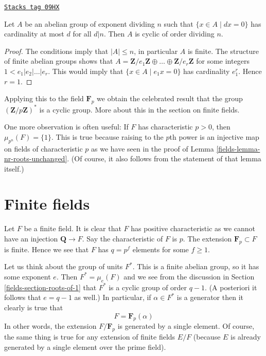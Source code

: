 \begin{lemma}[Cyclic]
\label{fields-lemma-cyclic}
\href{https://stacks.math.columbia.edu/tag/09HX}{\texttt{Stacks tag 09HX}}

Let $A$ be an abelian group of exponent dividing $n$ such that
$\{x \in A \mid dx = 0\}$ has cardinality at most $d$ for all $d | n$.
Then $A$ is cyclic of order dividing $n$.
\end{lemma}

\begin{proof}
The conditions imply that $|A| \leq n$, in particular $A$ is finite.
The structure of finite abelian groups shows that
$A = \mathbf{Z}/e_1\mathbf{Z} \oplus \ldots \oplus \mathbf{Z}/e_r\mathbf{Z}$
for some integers $1 < e_1 | e_2 | \ldots | e_r$. This would imply
that $\{x \in A \mid e_1 x = 0\}$ has cardinality $e_1^r$. Hence
$r = 1$.
\end{proof}

Applying this to the field $\mathbf{F}_p$ we obtain the celebrated result
that the group $(\mathbf{Z}/p\mathbf{Z})^*$ is a cyclic group. More about
this in the section on finite fields.

\medskip\noindent
One more observation is often useful: If $F$ has characteristic
$p > 0$, then $\mu_{p^n}(F) = \{1\}$. This is true because raising
to the $p$th power is an injective map on fields of characteristic $p$
as we have seen in the proof of Lemma \ref{fields-lemma-nr-roots-unchanged}.
(Of course, it also follows from the statement of that lemma itself.)

\section{Finite fields}
\label{fields-section-finite}
Let $F$ be a finite field. It is clear that $F$ has positive characteristic
as we cannot have an injection $\mathbf{Q} \to F$. Say the characteristic
of $F$ is $p$. The extension $\mathbf{F}_p \subset F$ is finite.
Hence we see that $F$ has $q = p^f$ elements for some $f \geq 1$.

\medskip\noindent
Let us think about the group of units $F^*$. This is a finite abelian
group, so it has some exponent $e$. Then $F^* = \mu_e(F)$ and we see
from the discussion in Section \ref{fields-section-roots-of-1} that $F^*$
is a cyclic group of order $q - 1$. (A posteriori it follows that
$e = q - 1$ as well.) In particular, if $\alpha \in F^*$ is a generator
then it clearly is true that
$$
F = \mathbf{F}_p(\alpha)
$$
In other words, the extension $F/\mathbf{F}_p$ is generated by a single
element. Of course, the same thing is true for any extension of finite
fields $E/F$ (because $E$ is already generated by a single element over
the prime field).

